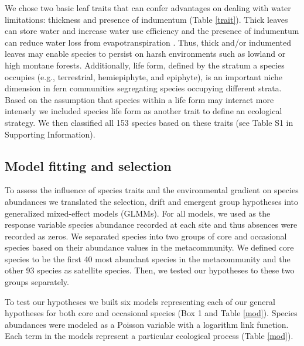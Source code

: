 \documentclass[12pt]{article}
\begin{document}
We chose two basic leaf traits that can confer advantages on dealing
with water limitations: thickness and presence of indumentum (Table
\ref{trait}). Thick leaves can store water and increase water use
efficiency and the presence of indumentum can reduce water loss from
evapotranspiration \citep{Watkins2012}. Thus, thick and/or indumented
leaves may enable species to persist on harsh environments such as
lowland or high montane forests.  Additionally, life form, defined by
the stratum a species occupies (e.g., terrestrial, hemiepiphyte, and
epiphyte), is an important niche dimension in fern communities
segregating species occupying different strata.  Based on the
assumption that species within a life form may interact more intensely
we included species life form as another trait to define an ecological
strategy. We then classified all 153 species based on these traits
(see Table S1 in Supporting Information).

\subsection*{Model fitting and selection}

To assess the influence of species traits and the environmental
gradient on species abundances we translated the selection, drift and
emergent group hypotheses into generalized mixed-effect models
(GLMMs).  For all models, we used as the response variable species
abundance recorded at each site and thus absences were recorded as
zeros. We separated species into two groups of core and occasional
species based on their abundance values in the metacommunity. We
defined core species to be the first 40 most abundant species in the
metacommunity and the other 93 species as satellite species. Then, we
tested our hypotheses to these two groups separately.

To test our hypotheses we built six models representing each of our
general hypotheses for both core and occasional species (Box 1 and
Table \ref{mod}). Species abundances were modeled as a Poisson
variable with a logarithm link function.  Each term in the models
represent a particular %
ecological process (Table \ref{mod}).
\end{document}
